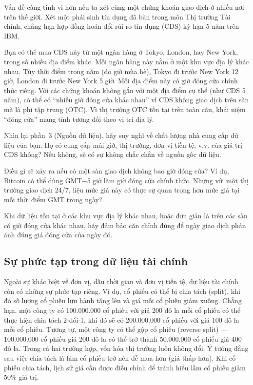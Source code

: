 Vấn đề càng tinh vi hơn nếu ta xét cùng một chứng khoán giao dịch ở nhiều nơi trên thế giới. Xét một phái sinh tín dụng đã bàn trong môn Thị trường Tài chính, chẳng hạn hợp đồng hoán đổi rủi ro tín dụng (CDS) kỳ hạn 5 năm trên IBM.

Bạn có thể mua CDS này từ một ngân hàng ở Tokyo, London, hay New York, trong số nhiều địa điểm khác. Mỗi ngân hàng này nằm ở một khu vực địa lý khác nhau. Tùy thời điểm trong năm (do giờ mùa hè), Tokyo đi trước New York 12 giờ, London đi trước New York 5 giờ. Mỗi địa điểm này có giờ đóng cửa chính thức riêng. Với các chứng khoán không gắn với một địa điểm cụ thể (như CDS 5 năm), có thể có ``nhiều giờ đóng cửa khác nhau'' vì CDS không giao dịch trên sàn mà là phi tập trung (OTC). Vì thị trường OTC tồn tại trên toàn cầu, khái niệm ``đóng cửa'' mang tính tương đối theo vị trí địa lý.

Nhìn lại phần~3 (Nguồn dữ liệu), hãy suy nghĩ về chất lượng nhà cung cấp dữ liệu của bạn. Họ có cung cấp múi giờ, thị trường, đơn vị tiền tệ, v.v. của giá trị CDS không? Nếu không, sẽ có sự không chắc chắn về nguồn gốc dữ liệu.

Điều gì sẽ xảy ra nếu có một sàn giao dịch không bao giờ đóng cửa? Ví dụ, Bitcoin có thể dùng GMT$-$5 giờ làm giờ đóng cửa chính thức. Nhưng với một thị trường giao dịch 24/7, liệu mức giá này có thực sự quan trọng hơn mức giá tại mỗi thời điểm GMT trong ngày?

Khi dữ liệu tồn tại ở các khu vực địa lý khác nhau, hoặc đơn giản là trên các sàn có giờ đóng cửa khác nhau, hãy đảm bảo căn chỉnh đúng để ngày giao dịch phản ánh đúng giá đóng cửa của ngày đó.

\subsection{Sự phức tạp trong dữ liệu tài chính}

Ngoài sự khác biệt về đơn vị, dấu thời gian và đơn vị tiền tệ, dữ liệu tài chính còn có những sự phức tạp riêng. Ví dụ, cổ phiếu có thể bị chia tách (split), khi đó số lượng cổ phiếu lưu hành tăng lên và giá mỗi cổ phiếu giảm xuống. Chẳng hạn, một công ty có 100.000.000 cổ phiếu với giá 200 đô la mỗi cổ phiếu có thể thực hiện chia tách 2-đổi-1, khi đó sẽ có 200.000.000 cổ phiếu với giá 100 đô la mỗi cổ phiếu. Tương tự, một công ty có thể gộp cổ phiếu (reverse split) — 100.000.000 cổ phiếu giá 200 đô la có thể trở thành 50.000.000 cổ phiếu giá 400 đô la. Trong cả hai trường hợp, vốn hóa thị trường luôn không đổi. Ý tưởng đằng sau việc chia tách là làm cổ phiếu trở nên dễ mua hơn (giá thấp hơn). Khi cổ phiếu chia tách, lịch sử giá cần được điều chỉnh để tránh hiểu lầm cổ phiếu giảm 50\% giá trị.

